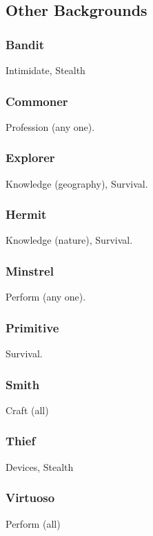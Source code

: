 \subsection{Other Backgrounds}

\subsubsection{Bandit}
 Intimidate, Stealth

\subsubsection{Commoner}
 Profession (any one).

\subsubsection{Explorer}
 Knowledge (geography), Survival.

\subsubsection{Hermit}
 Knowledge (nature), Survival.

\subsubsection{Minstrel}
 Perform (any one).

\subsubsection{Primitive}
 Survival.

\subsubsection{Smith}
 Craft (all)

\subsubsection{Thief}
 Devices, Stealth

\subsubsection{Virtuoso}
 Perform (all)
